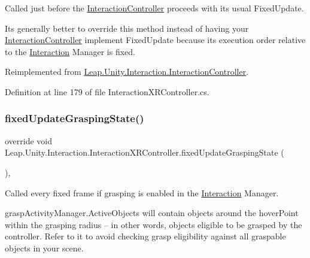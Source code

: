 Called just before the \mbox{\hyperlink{class_leap_1_1_unity_1_1_interaction_1_1_interaction_controller}{Interaction\+Controller}} proceeds with its usual Fixed\+Update. 

It\textquotesingle{}s generally better to override this method instead of having your \mbox{\hyperlink{class_leap_1_1_unity_1_1_interaction_1_1_interaction_controller}{Interaction\+Controller}} implement Fixed\+Update because its execution order relative to the \mbox{\hyperlink{namespace_leap_1_1_unity_1_1_interaction}{Interaction}} Manager is fixed. 

Reimplemented from \mbox{\hyperlink{class_leap_1_1_unity_1_1_interaction_1_1_interaction_controller_ad66e5a09bdbe3e9573a504734bbc34f8}{Leap.\+Unity.\+Interaction.\+Interaction\+Controller}}.



Definition at line 179 of file Interaction\+X\+R\+Controller.\+cs.

\mbox{\label{class_leap_1_1_unity_1_1_interaction_1_1_interaction_x_r_controller_abbf181ce05807d75809cac14c0fa8a27}} 
\subsubsection{\texorpdfstring{fixedUpdateGraspingState()}{fixedUpdateGraspingState()}}
{\footnotesize\ttfamily override void Leap.\+Unity.\+Interaction.\+Interaction\+X\+R\+Controller.\+fixed\+Update\+Grasping\+State (\begin{DoxyParamCaption}{ }\end{DoxyParamCaption})\hspace{0.3cm}{\ttfamily [protected]}, {\ttfamily [virtual]}}



Called every fixed frame if grasping is enabled in the \mbox{\hyperlink{namespace_leap_1_1_unity_1_1_interaction}{Interaction}} Manager. 

grasp\+Activity\+Manager.\+Active\+Objects will contain objects around the hover\+Point within the grasping radius -- in other words, objects eligible to be grasped by the controller. Refer to it to avoid checking grasp eligibility against all graspable objects in your scene. 

